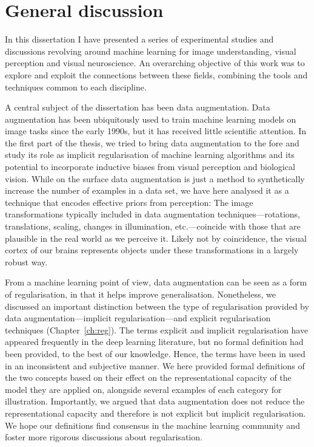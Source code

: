 {
\chapter{General discussion}
\label{ch:discussion}
\renewcommand{\chapterpath}{includes/discussion}
In this dissertation I have presented a series of experimental studies and discussions revolving around machine learning for image understanding, visual perception and visual neuroscience. An overarching objective of this work was to explore and exploit the connections between these fields, combining the tools and techniques common to each discipline. 

A central subject of the dissertation has been data augmentation. Data augmentation has been ubiquitously used to train machine learning models on image tasks since the early 1990s, but it has received little scientific attention. In the first part of the thesis, we tried to bring data augmentation to the fore and study its role as implicit regularisation of machine learning algorithms and its potential to incorporate inductive biases from visual perception and biological vision. While on the surface data augmentation is just a method to synthetically increase the number of examples in a data set, we have here analysed it as a technique that encodes effective priors from perception: The image transformations typically included in data augmentation techniques---rotations, translations, scaling, changes in illumination, etc.---coincide with those that are plausible in the real world as we perceive it. Likely not by coincidence, the visual cortex of our brains represents objects under these transformations in a largely robust way.

From a machine learning point of view, data augmentation can be seen as a form of regularisation, in that it helps improve generalisation. Nonetheless, we discussed an important distinction between the type of regularisation provided by data augmentation---implicit regularisation---and explicit regularisation techniques (Chapter~\ref{ch:reg}). The terms explicit and implicit regularisation have appeared frequently in the deep learning literature, but no formal definition had been provided, to the best of our knowledge. Hence, the terms have been in used in an inconsistent and subjective manner. We here provided formal definitions of the two concepts based on their effect on the representational capacity of the model they are applied on, alongside several examples of each category for illustration. Importantly, we argued that data augmentation does not reduce the representational capacity and therefore is not explicit but implicit regularisation. We hope our definitions find consensus in the machine learning community and foster more rigorous discussions about regularisation.

}
